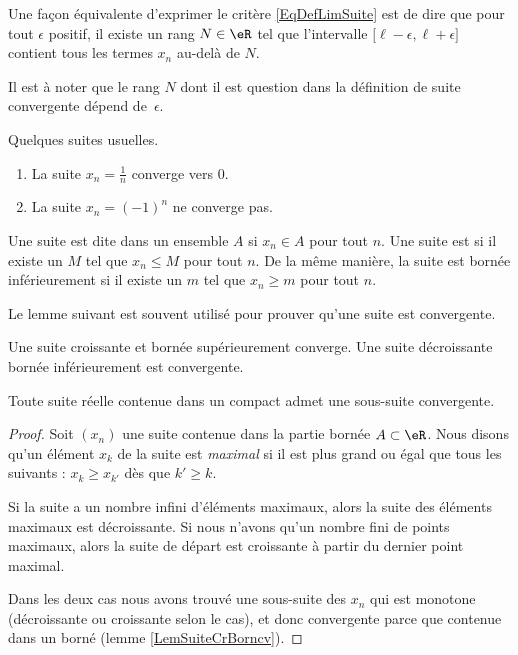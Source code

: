 Une façon équivalente d'exprimer le critère \eqref{EqDefLimSuite} est de dire que pour tout $\epsilon$ positif, il existe un rang $N\in\eR$ tel que l'intervalle $\mathopen[ \ell-\epsilon , \ell+\epsilon \mathclose]$ contient tous les termes $x_n$ au-delà de $N$.

Il est à noter que le rang $N$ dont il est question dans la définition de suite convergente dépend de~$\epsilon$.

\begin{example}
	Quelques suites usuelles.
	\begin{enumerate}
		\item
			La suite $x_n=\frac{1}{ n }$ converge vers $0$.
		\item
			La suite $x_n=(-1)^n$ ne converge pas.
	\end{enumerate}
\end{example}

Une suite est dite  dans un ensemble $A$ si $x_n\in A$ pour tout $n$. Une suite est  si il existe un $M$ tel que $x_n\leq M$ pour tout $n$. De la même manière, la suite est bornée inférieurement si il existe un $m$ tel que $x_n\geq m$ pour tout $n$.

Le lemme suivant est souvent utilisé pour prouver qu'une suite est convergente.
\begin{lemma}		\label{LemSuiteCrBorncv}
	Une suite croissante et bornée supérieurement converge. Une suite décroissante bornée inférieurement est convergente.
\end{lemma}

\begin{theorem}
	Toute suite réelle contenue dans un compact admet une sous-suite convergente.
\end{theorem}

\begin{proof}
	Soit $(x_n)$ une suite contenue dans la partie bornée $A\subset\eR$. Nous disons qu'un élément $x_k$ de la suite est \emph{maximal} si il est plus grand ou égal que tous les suivants : $x_k\geq x_{k'}$ dès que $k'\geq k$.

	Si la suite a un nombre infini d'éléments maximaux, alors la suite des éléments maximaux est décroissante. Si nous n'avons qu'un nombre fini de points maximaux, alors la suite de départ est croissante à partir du dernier point maximal.

	Dans les deux cas nous avons trouvé une sous-suite des $x_n$ qui est monotone (décroissante ou croissante selon le cas), et donc convergente parce que contenue dans un borné (lemme \ref{LemSuiteCrBorncv}).
\end{proof}


